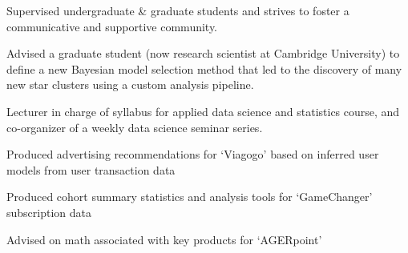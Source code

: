 \documentclass[letterpaper,12pt]{deedy-resume}
\begin{document}
\begin{minipage}[t]{0.64\textwidth}
\begin{tightitemize}
    \item Supervised undergraduate \& graduate students and strives to foster a communicative and supportive community.
    \item Advised a graduate student (now research scientist at Cambridge University) to define a new Bayesian model selection method that led to the discovery of many new star clusters using a custom analysis pipeline.
    \item Lecturer in charge of syllabus for applied data science and statistics course, and co-organizer of a weekly data science seminar series.
\end{tightitemize}

\sectionspace %



\begin{tightitemize}
    \item Produced advertising recommendations for `Viagogo' based on inferred user models from user transaction data
    \item Produced cohort summary statistics and analysis tools for `GameChanger' subscription data
    \item Advised on math associated with key products for `AGERpoint'
\end{tightitemize}

\sectionspace %




\end{minipage}
\end{document}
